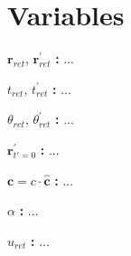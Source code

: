 \section{Variables}

\noindent ${\mathbf{r}_{ret}}$, ${\mathbf{r}_{ret}^{'}}$ \textbf{:}
...

\noindent ${t_{ret}}$, ${t_{ret}^{'}}$ \textbf{:}
...

\noindent ${\theta_{ret}}$, ${\theta_{ret}^{'}}$ \textbf{:}
...

\noindent ${\mathbf{r}_{t'=0}^{'}}$ \textbf{:}
...

\noindent ${\mathbf{c}}= c \cdot {\mathbf{\hat{c}}}$ \textbf{:}
...

\noindent ${\alpha}$ \textbf{:}
...

\noindent ${u_{ret}}$ \textbf{:}
...